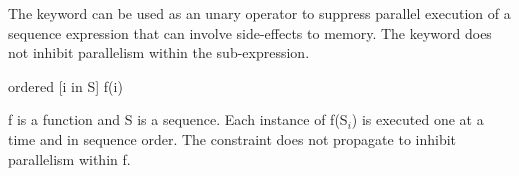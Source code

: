 The  keyword can be used as an unary operator to
suppress parallel execution of a sequence expression that can involve
side-effects to memory. The  keyword does not inhibit
parallelism within the sub-expression.

\begin{example}
\begin{chapel}
ordered [i in S] f(i) 
\end{chapel}
f is a function and S is a sequence. Each instance of
f(S$_i$) is executed one at a time and in sequence order. The
 constraint does not propagate to inhibit parallelism
within f.
\end{example}
